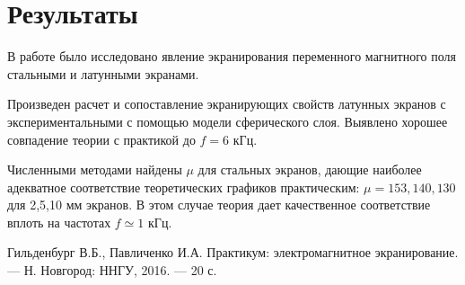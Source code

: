 \documentclass[a4paper,12pt]{article}
\begin{document}
\section{Результаты}
	В работе было исследовано явление экранирования переменного магнитного поля стальными и латунными экранами. 

	Произведен расчет и сопоставление экранирующих свойств латунных экранов с экспериментальными с помощью модели сферического слоя. Выявлено хорошее совпадение теории с практикой до $f=6$ кГц. 

	Численными методами найдены $\mu$ для стальных экранов, дающие наиболее адекватное соответствие теоретических графиков практическим: $\mu=153,140,130$ для 2,5,10 мм экранов. В этом случае теория дает качественное соответствие вплоть на частотах $f \simeq 1$ кГц.


\begin{thebibliography}{}
	 Гильденбург В.Б., Павличенко И.А. Практикум: электромагнитное экранирование. --- Н. Новгород: ННГУ, 2016. --- 20 с.
\end{thebibliography}
\end{document}
